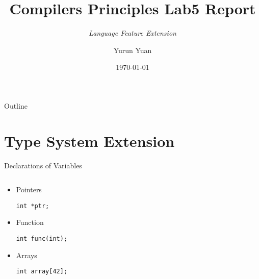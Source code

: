 \documentclass{beamer}
\title{Compilers Principles Lab5 Report }
\subtitle{\it{Language Feature Extension}}
\author{Yurun Yuan}
\institute{CS, USTC}
\date{\today}
\begin{document}

\begin{frame}
    \titlepage
\end{frame}

\begin{frame}{Outline}
    \tableofcontents
\end{frame}



\section{Type System Extension}

\begin{frame}{Declarations of Variables}
    \begin{columns}
        \begin{column}[]{0.5\textwidth}
            \begin{itemize}
                \item Pointers

                      \lstinline{int *ptr;}

                \item Function

                      \lstinline{int func(int);}

                \item Arrays

                      \lstinline{int array[42];}
            \end{itemize}
        \end{column}
        \begin{column}[]{0.5\textwidth}
        \end{column}
    \end{columns}
\end{frame}
\end{document}
